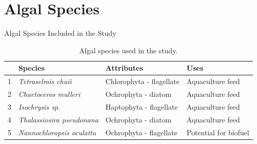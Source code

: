 \documentclass[8pt]{beamer}\usepackage[]{graphicx}\usepackage[]{color}
\begin{document}
\section{Algal Species}
\begin{frame}[fragile]{Algal Species Included in the Study}

\begin{table}[ht]
\centering
\begin{tabular}{rlll}
  \hline
 & Species & Attributes & Uses \\ 
  \hline
1 & \emph{Tetraselmis chuii} & Chlorophyta - flagellate & Aquaculture feed \\ 
  2 & \emph{Chaetoceros mulleri} & Ochrophyta - diatom & Aquaculture feed \\ 
  3 & \emph{Isochrysis sp.} & Haptophyta - flagellate & Aquaculture feed \\ 
  4 & \emph{Thalassiosira pseudonana} & Ochrophyta - diatom & Aquaculture feed \\ 
  5 & \emph{Nannochloropsis oculatta} & Ochrophyta - flagellate & Potential for biofuel \\ 
   \hline
\end{tabular}
\caption{Algal species used in the study.} 
\label{tab:Algae_Species}
\end{table}


\end{frame}
\end{document}
